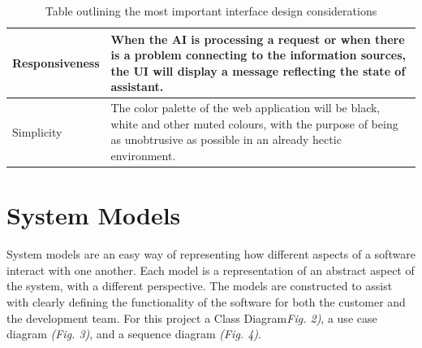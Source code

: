 \documentclass[]{IEEEtran}
\begin{document}
\begin{table}[h]
\begin{tabular}{| m{2cm} | m{5.5cm} | }
		\hline
		
		Responsiveness & When the AI is processing a request or when there is a problem connecting to the information sources, the UI will display a message reflecting the state of assistant. \\
		
		\hline 
		
		Simplicity & The color palette of the web application will be black, white and other muted colours, with the purpose of being as unobtrusive as possible in an already hectic environment. \\
		
		\hline
		
	
	\end{tabular}
		\caption{Table outlining the most important interface design considerations}
	
	\end{table}
	
	\section{System Models}
	
	System models are an easy way of representing how different aspects of a software interact with one another. Each model is a representation of an abstract aspect of the system, with a different perspective. The models are constructed to assist with clearly defining the functionality of the software for both the customer and the development team. For this project a Class Diagram\textit{Fig. 2)}, a use case diagram \textit{(Fig. 3)}, and a sequence diagram \textit{(Fig. 4)}.
	
\end{document}

